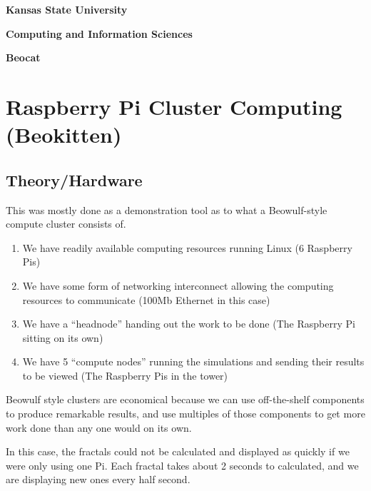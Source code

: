 \documentclass[letterpaper,10pt]{article}
\begin{document}
  \begin{minipage}[t]{0.33\textwidth}
    \begin{center}
      \textcolor[RGB]{81,40,136}{\Large{\textbf{Kansas State University}}}
    \end{center}
  \end{minipage}
  \begin{minipage}[t]{0.33\textwidth}
    \begin{center}
      \textcolor[RGB]{81,40,136}{\Large{\textbf{Computing and Information Sciences}}}
    \end{center}
  \end{minipage}
  \begin{minipage}[t]{0.33\textwidth}
    \begin{center}
      \textcolor[RGB]{81,40,136}{\Large{\textbf{Beocat}}}
    \end{center}
  \end{minipage}

  \section{Raspberry Pi Cluster Computing (Beokitten)}
    \subsection{Theory/Hardware}
      This was mostly done as a demonstration tool as to what a Beowulf-style compute cluster consists of.
      \begin{enumerate}
        \item We have readily available computing resources running Linux (6 Raspberry Pis)
        \item We have some form of networking interconnect allowing the computing resources to communicate (100Mb Ethernet in this case)
        \item We have a ``headnode'' handing out the work to be done (The Raspberry Pi sitting on its own)
        \item We have 5 ``compute nodes'' running the simulations and sending their results to be viewed (The Raspberry Pis in the tower)
      \end{enumerate}

      Beowulf style clusters are economical because we can use off-the-shelf components to produce remarkable results, and use multiples of those components to get more work done than any one would on its own.

      In this case, the fractals could not be calculated and displayed as quickly if we were only using one Pi.
      Each fractal takes about 2 seconds to calculated, and we are displaying new ones every half second.
\end{document}
